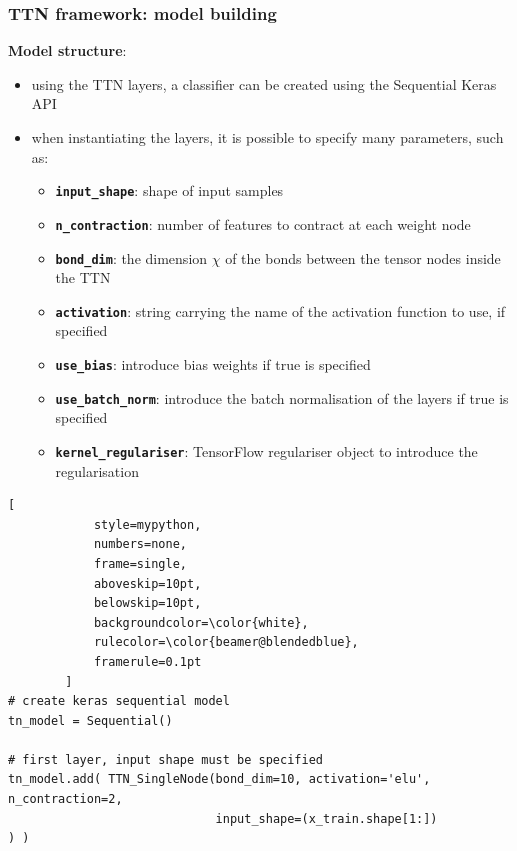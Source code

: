\documentclass[xcolor=table,8pt]{beamer}
\begin{document}
    \begin{frame}[t, fragile]
        \frametitle{TTN framework: model building}
        \textbf{Model structure}:
        \begin{itemize}
            \item using the TTN layers, a classifier can be created using the \alert{Sequential Keras API}
            \item when instantiating the layers, it is possible to specify many parameters, such as:
            \begin{itemize}
                \item \alert{\texttt{\bfseries input\_shape}}: shape of input samples
                \item \alert{\texttt{\bfseries n\_contraction}}: number of features to contract at each weight node
                \item \alert{\texttt{\bfseries bond\_dim}}: the dimension \( \chi \) of the bonds between the tensor nodes inside the TTN
                \item \alert{\texttt{\bfseries activation}}: string carrying the name of the activation function to use, if specified
                \item \alert{\texttt{\bfseries use\_bias}}: introduce bias weights if true is specified
                \item \alert{\texttt{\bfseries use\_batch\_norm}}: introduce the batch normalisation of the layers if true is specified
                \item \alert{\texttt{\bfseries kernel\_regulariser}}: TensorFlow regulariser object to introduce the regularisation
            \end{itemize}
        \end{itemize}

        \begin{lstlisting}[
            style=mypython,
            numbers=none,
            frame=single,
            aboveskip=10pt,
            belowskip=10pt,
            backgroundcolor=\color{white},
            rulecolor=\color{beamer@blendedblue},
            framerule=0.1pt
        ]
# create keras sequential model
tn_model = Sequential()

# first layer, input shape must be specified
tn_model.add( TTN_SingleNode(bond_dim=10, activation='elu',     n_contraction=2, 
                             input_shape=(x_train.shape[1:])                    ) )


\end{lstlisting}
\end{frame}
\end{document}
